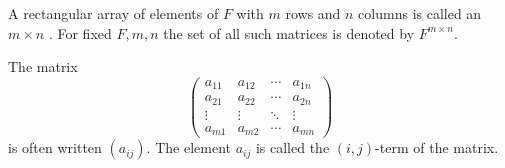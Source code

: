 A rectangular array of elements of $F$ with $m$ rows and $n$ columns is called an $m \times n$ . For fixed $F, m, n$ the set of all such matrices is denoted by $F^{m \times n}$.

The matrix
$$
\begin{pmatrix}
a_{11} & a_{12} & \cdots & a_{1n} \\
a_{21} & a_{22} & \cdots & a_{2n} \\
\vdots & \vdots & \ddots & \vdots \\
a_{m1} & a_{m2} & \cdots & a_{mn}
\end{pmatrix}
$$
is often written $(a_{ij})$. The element $a_{ij}$ is called the $(i, j)$-term of the matrix.
